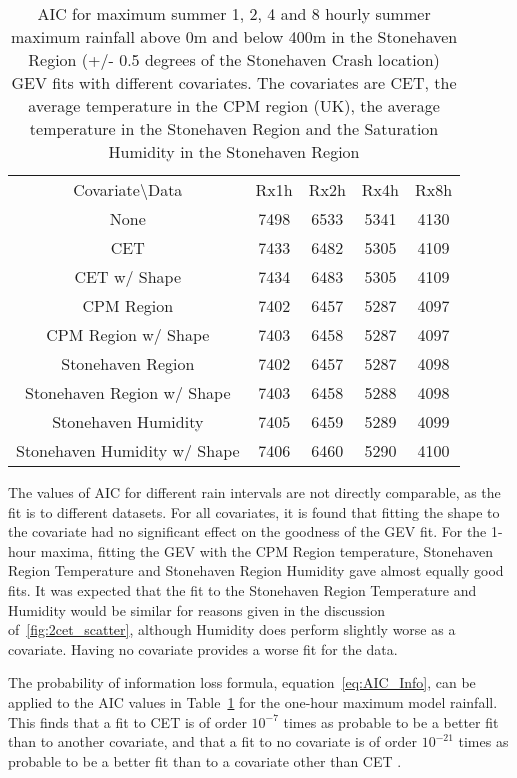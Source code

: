 \begin{table}[H]
    \centering
    \begin{tabular}{c c c c c}
        Covariate\textbackslash Data & Rx1h & Rx2h & Rx4h & Rx8h \\
        None &7498&6533&5341&4130 \\
        CET &7433&6482&5305&4109 \\
        CET w/ Shape &7434&6483&5305&4109 \\
        CPM Region &7402&6457&5287&4097 \\
        CPM Region w/ Shape &7403&6458&5287&4097 \\
        Stonehaven Region &7402&6457&5287&4098 \\
        Stonehaven Region w/ Shape &7403&6458&5288&4098 \\
        Stonehaven Humidity &7405&6459&5289&4099 \\
        Stonehaven Humidity w/ Shape &7406&6460&5290&4100 \\
    \end{tabular}
    \caption[AIC for maximum summer rainfall]{
        AIC for maximum summer 1, 2, 4 and 8 hourly summer maximum rainfall
        above 0m and below 400m in the Stonehaven Region (+/- 0.5 degrees of the Stonehaven Crash location)
        GEV fits with different covariates.
    The covariates are CET, the average temperature in the CPM region (UK),
    the average temperature in the Stonehaven Region and
    the Saturation Humidity in the Stonehaven Region}
    \label{tab:AICtable}
\end{table}

The values of AIC for different rain intervals are not directly comparable,
    as the fit is to different datasets.
For all covariates,
    it is found that fitting the shape to the covariate had no significant effect on the goodness of the GEV fit.
For the 1-hour maxima,
    fitting the GEV with the CPM Region temperature, Stonehaven Region Temperature and Stonehaven Region Humidity gave almost equally good fits.
It was expected that the fit to the Stonehaven Region Temperature and Humidity would be similar for
    reasons given in the discussion of~\ref{fig:2cet_scatter},
    although Humidity does perform slightly worse as a covariate.
Having no covariate provides a worse fit for the data.

The probability of information loss formula, equation~\ref{eq:AIC_Info},
    can be applied to the AIC values in Table~\ref{tab:AICtable} for the one-hour maximum model rainfall.
This finds that a fit to CET is of order $10^{-7}$ times as probable to be a better fit than to another covariate,
    and that a fit to no covariate is of order $10^{-21}$ times as probable to be a better fit than to a covariate other than CET .

